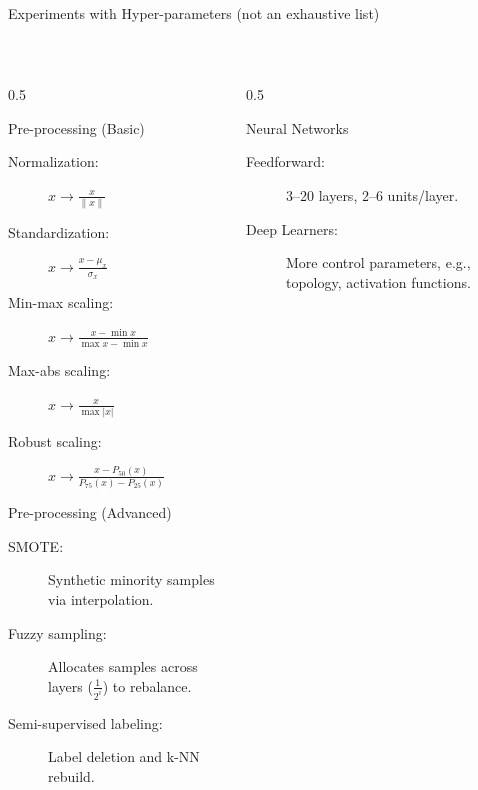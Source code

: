 \documentclass[10pt,aspectratio=169]{beamer}
\begin{document}
    \begin{frame}[t]{Experiments with Hyper-parameters (not an exhaustive list)} 

    ~\\
\scriptsize
\begin{columns}[t]
\begin{column}{0.5\textwidth}
\begin{block}{\small Pre-processing (Basic)}
\begin{description}
\item[Normalization:] $x \rightarrow \frac{x}{\|x\|}$
\item[Standardization:] $x \rightarrow \frac{x - \mu_x}{\sigma_x}$
\item[Min-max scaling:] $x \rightarrow \frac{x - \min x}{\max x - \min x}$
\item[Max-abs scaling:] $x \rightarrow \frac{x}{\max |x|}$
\item[Robust scaling:] $x \rightarrow \frac{x - P_{50}(x)}{P_{75}(x) - P_{25}(x)}$
\end{description}
\end{block}

\vspace{1mm}

\begin{block}{\small Pre-processing (Advanced)}
\begin{description}
\item[SMOTE:] Synthetic minority samples via interpolation.
\item[Fuzzy sampling:] Allocates samples across layers ($\frac{1}{2^i}$) to rebalance.
\item[Semi-supervised labeling:] Label deletion and k-NN rebuild.
\end{description}
\end{block}
\end{column}


\begin{column}{0.5\textwidth}
\begin{block}{\small Neural Networks}
\begin{description}
\item[Feedforward:] 3--20 layers, 2--6 units/layer.
\item[Deep Learners:] More control parameters, e.g., topology, activation functions.
\end{description}
\end{block}

\vspace{1mm}


\end{column}
\end{columns}
\end{frame}
\end{document}
